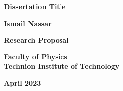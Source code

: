 \thispagestyle{empty}
\begin{center}
\Large

\textbf{Dissertation Title}

\vspace{2.0in}

\textbf{Ismail Nassar}

\vspace{1.5in}

\textbf{Research Proposal}

\vspace{0.5in}

\textbf{Faculty of Physics}\\
\textbf{Technion Institute of Technology}



\textbf{April 2023}
\end{center}